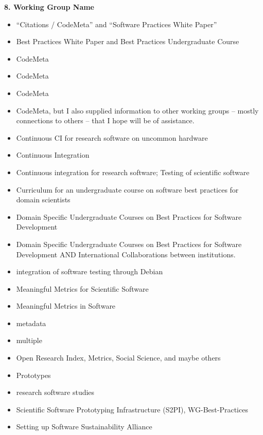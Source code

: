 

\noindent \textbf{8. Working Group Name}

\begin{itemize}
\item ``Citations / CodeMeta''  and  ``Software Practices White Paper''
\item Best Practices White Paper and Best Practices Undergraduate Course
\item CodeMeta
\item CodeMeta
\item CodeMeta
\item CodeMeta, but I also supplied information to other working groups -- mostly connections to others -- that I hope will be of assistance.
\item Continuous CI for research software on uncommon hardware
\item Continuous Integration
\item Continuous integration for research software; Testing of scientific software
\item Curriculum for an undergraduate course on software best practices for domain scientists
\item Domain Specific Undergraduate Courses on Best Practices for Software Development
\item Domain Specific Undergraduate Courses on Best Practices for Software Development AND International Collaborations between institutions.
\item integration of software testing through Debian
\item Meaningful Metrics for Scientific Software
\item Meaningful Metrics in Software
\item metadata
\item multiple
\item Open Research Index, Metrics, Social Science, and maybe others
\item Prototypes
\item research software studies
\item Scientific Software Prototyping Infrastructure (S2PI), WG-Best-Practices
\item Setting up Software Sustainability Alliance

\end{itemize}
